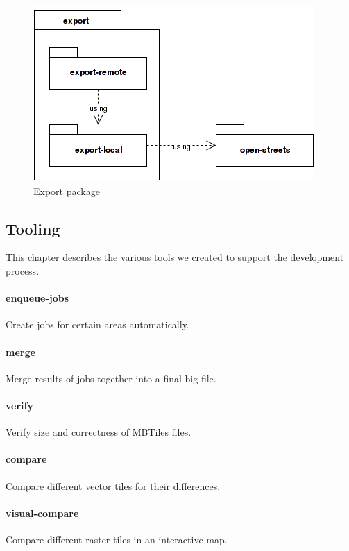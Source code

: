 \begin{figure}[h]
  \includegraphics[scale=0.6]{images/export_package.png}
  \caption{Export package}
\end{figure}
\newpage

\newpage
\subsection{Tooling}

This chapter describes the various tools we created to support the development process.

\paragraph{enqueue-jobs}
Create jobs for certain areas automatically.

\paragraph{merge}
Merge results of jobs together into a final big file.

\paragraph{verify}
Verify size and correctness of MBTiles files.

\paragraph{compare}
Compare different vector tiles for their differences.

\paragraph{visual-compare}
Compare different raster tiles in an interactive map.

